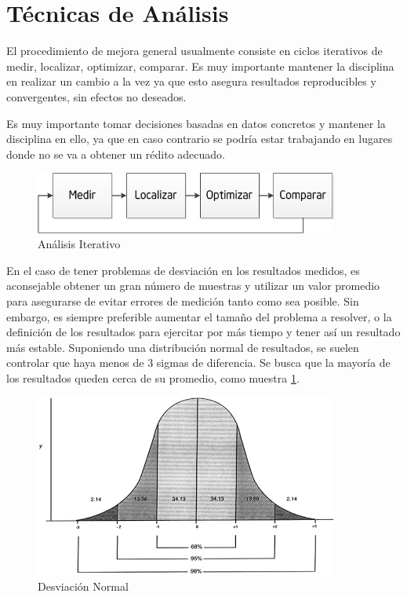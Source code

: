 \documentclass[a4paper]{report}
\begin{document}
\section{T\'ecnicas de An\'alisis}

El procedimiento de mejora general usualmente consiste en ciclos iterativos de medir, localizar, optimizar,
comparar. Es muy importante mantener la disciplina en realizar un cambio a la
vez ya que esto asegura resultados reproducibles y convergentes, sin efectos no deseados.

\bigskip

Es muy importante tomar decisiones basadas en datos concretos y mantener la disciplina en ello,
ya que en caso contrario se podr\'ia estar trabajando en lugares donde no se va a obtener
un r\'edito adecuado.

\begin{figure}[H]
\begin{center}
\includegraphics[width=10cm]{cycle.png}
\caption{An\'alisis Iterativo}
\end{center}
\end{figure}

\bigskip

En el caso de tener problemas de desviaci\'on en los resultados medidos, es aconsejable obtener un gran n\'umero de muestras y utilizar
un valor promedio para asegurarse de evitar errores de medici\'on tanto como sea posible. Sin embargo, es siempre preferible aumentar el tama\~no
del problema a resolver, o la definici\'on de los resultados para ejercitar por m\'as tiempo y tener as\'i un resultado m\'as estable.
Suponiendo una distribuci\'on normal de resultados, se suelen controlar que haya menos de
3 sigmas de diferencia. Se busca que la mayor\'ia de los resultados queden cerca
de su promedio, como muestra \ref{fig:deviation}.

\begin{figure}[H]
\label{fig:deviation}
\begin{center}
\includegraphics[width=10cm]{deviation.png}
\caption{Desviaci\'on Normal}
\end{center}
\end{figure}
\end{document}
